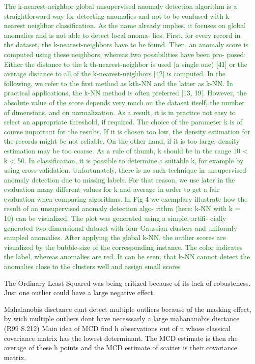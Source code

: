 \newpage
\textcolor{green}
{The k-nearest-neighbor global unsupervised anomaly detection algorithm is a straightforward
way for detecting anomalies and not to be confused with k-nearest neighbor classification. As
the name already implies, it focuses on global anomalies and is not able to detect local anoma-
lies. First, for every record in the dataset, the k-nearest-neighbors have to be found. Then, an
anomaly score is computed using these neighbors, whereas two possibilities have been pro-
posed: Either the distance to the k th-nearest-neighbor is used (a single one) [41] or the average
distance to all of the k-nearest-neighbors [42] is computed. In the following, we refer to the
first method as kth-NN and the latter as k-NN. In practical applications, the k-NN method is
often preferred [13, 19]. However, the absolute value of the score depends very much on the
dataset itself, the number of dimensions, and on normalization. As a result, it is in practice not
easy to select an appropriate threshold, if required.
The choice of the parameter k is of course important for the results. If it is chosen too low,
the density estimation for the records might be not reliable. On the other hand, if it is too large,
density estimation may be too coarse. As a rule of thumb, k should be in the range 10 < k < 50.
In classification, it is possible to determine a suitable k, for example by using cross-validation.
Unfortunately, there is no such technique in unsupervised anomaly detection due to missing
labels. For that reason, we use later in the evaluation many different values for k and average in
order to get a fair evaluation when comparing algorithms.
In Fig 4 we exemplary illustrate how the result of an unsupervised anomaly detection algo-
rithm (here: k-NN with k = 10) can be visualized. The plot was generated using a simple, artifi-
cially generated two-dimensional dataset with four Gaussian clusters and uniformly sampled
anomalies. After applying the global k-NN, the outlier scores are visualized by the bubble-size
of the corresponding instance. The color indicates the label, whereas anomalies are red. It can
be seen, that k-NN cannot detect the anomalies close to the clusters well and assign small
scores \citep[p.8+9]{goldstein2016comparative}}



The Ordinary Least Squared was being critized because of its lack of robusteness. Just one outlier could have a large negative effect.


Mahalanobis disctance cant detect multiple outliers because of the masking effect, by wich multiple outliers dont have necesssarly a large mahananobis disctance (R99 S.212)
Main idea of MCD find h observations out of n whose classical covariance matrix has the lowest determinant. The MCD estimate is then rhe average of these h points 
and the MCD estimate of scatter is their covariance matrix. 


